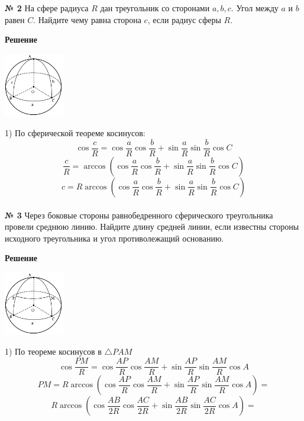     \textbf{№ 2}
    На сфере радиуса $R$ дан треугольник со сторонами $a, b, c$.
    Угол между $a$ и $b$ равен $C$.
    Найдите чему равна сторона $c$, если радиус сферы $R$.

    \textbf{Решение}\\

    \begin{center}
        \includegraphics[width=0.2\textwidth]{images/img4}\\
    \end{center}

    1) По сферической теореме косинусов:
    \[
        \cos \frac{c}{R} = \cos\frac{a}{R}\cos\frac{b}{R} + \sin\frac{a}{R}\sin\frac{b}{R}\cos C
    \]
    \[
        \frac{c}{R} = \arccos\left( \cos\frac{a}{R}\cos\frac{b}{R} + \sin\frac{a}{R}\sin\frac{b}{R}\cos C\right)
    \]
    \[
        c = R\arccos\left( \cos\frac{a}{R}\cos\frac{b}{R} + \sin\frac{a}{R}\sin\frac{b}{R}\cos C\right)
    \]\\


    \textbf{№ 3}
    Через боковые стороны равнобедренного сферического треугольника провели среднюю линию.
    Найдите длину средней линии, если известны стороны исходного треугольника и угол противолежащий основанию.

    \textbf{Решение}\\

    \begin{center}
        \includegraphics[width=0.2\textwidth]{images/img5}\\
    \end{center}

    1) По теореме косинусов в $\triangle PAM$
    \[
        \cos \frac{PM}{R} = \cos \frac{AP}{R}\cos\frac{AM}{R} + \sin\frac{AP}{R}\sin\frac{AM}{R}\cos A
    \]
    \[
        PM = R\arccos \left(\cos \frac{AP}{R}\cos\frac{AM}{R} + \sin\frac{AP}{R}\sin\frac{AM}{R}\cos A\right) =
    \]
    \[
        R\arccos \left(\cos \frac{AB}{2R}\cos\frac{AC}{2R} + \sin\frac{AB}{2R}\sin\frac{AC}{2R}\cos A\right) =
    \]\\


